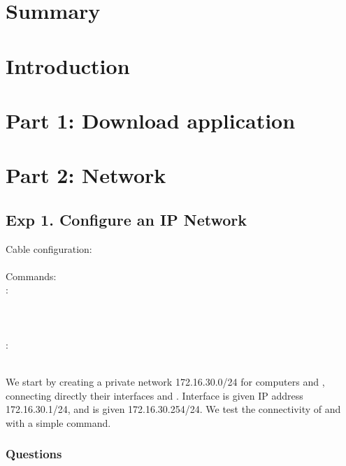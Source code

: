 \documentclass[compilation.tex]{subfiles}
\begin{document}
\section{Summary}
\label{sec:summary}

\section{Introduction}
\label{sec:introduction}

\section{Part 1: Download application}
\label{sec:downloadapp}

\section{Part 2: Network}
\label{sec:network}

\clearpage
\subsection[Configure an IP Network]{Exp 1. Configure an IP Network}
\label{subsec:exp1}

\begin{cables}{7}{0.40}
	Cable configuration:\\
	\\
	
	Commands:\\
	:\\
	\\
	\\
	\\
	:\\
	\\
\end{cables}

We start by creating a private network 172.16.30.0/24 for computers  and , connecting directly their interfaces  and . Interface  is given IP address 172.16.30.1/24, and  is given 172.16.30.254/24.
We test the connectivity of  and  with a simple  command.

\subsubsection{Questions}
\label{subsubsec:exp1questions}
\end{document}
